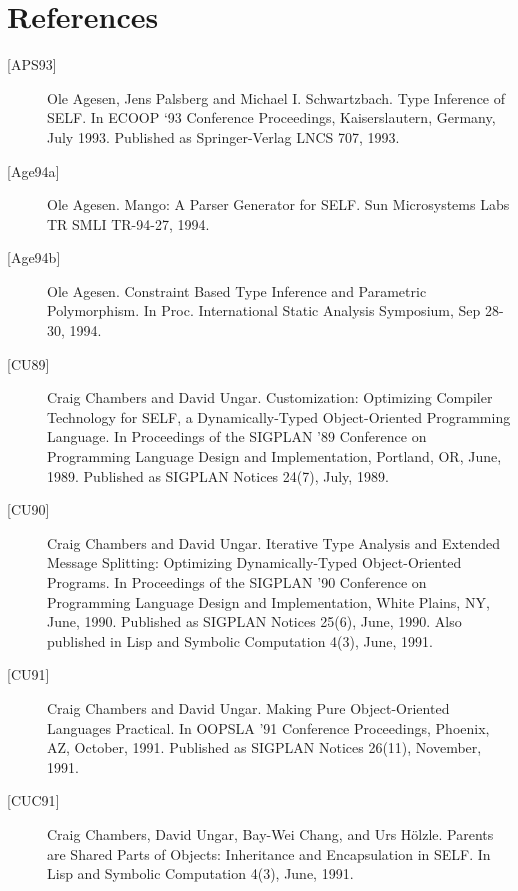 \documentclass[letterpaper,10pt,english]{sphinxmanual}
\begin{document}
\chapter{References}
\label{ref:references}\label{ref:citations}\label{ref::doc}\begin{description}
\item[{{[}APS93{]}}] \leavevmode
Ole Agesen, Jens Palsberg and Michael I. Schwartzbach. Type Inference of SELF. In ECOOP ‘93 Conference Proceedings, Kaiserslautern, Germany, July 1993. Published as Springer-Verlag LNCS 707, 1993.

\item[{{[}Age94a{]}}] \leavevmode
Ole Agesen. Mango: A Parser Generator for SELF. Sun Microsystems Labs TR SMLI TR-94-27, 1994.

\item[{{[}Age94b{]}}] \leavevmode
Ole Agesen. Constraint Based Type Inference and Parametric Polymorphism. In Proc. International Static Analysis Symposium, Sep 28-30, 1994.

\item[{{[}CU89{]}}] \leavevmode
Craig Chambers and David Ungar. Customization: Optimizing Compiler Technology for SELF, a Dynamically-Typed Object-Oriented Programming Language. In Proceedings of the SIGPLAN ’89 Conference on Programming Language Design and Implementation, Portland, OR, June, 1989. Published as SIGPLAN Notices 24(7), July, 1989.

\item[{{[}CU90{]}}] \leavevmode
Craig Chambers and David Ungar. Iterative Type Analysis and Extended Message Splitting: Optimizing Dynamically-Typed Object-Oriented Programs. In Proceedings of the SIGPLAN ’90 Conference on Programming Language Design and Implementation, White Plains, NY, June, 1990. Published as SIGPLAN Notices 25(6), June, 1990. Also published in Lisp and Symbolic Computation 4(3), June, 1991.

\item[{{[}CU91{]}}] \leavevmode
Craig Chambers and David Ungar. Making Pure Object-Oriented Languages Practical. In OOPSLA ’91 Conference Proceedings, Phoenix, AZ, October, 1991. Published as SIGPLAN Notices 26(11), November, 1991.

\item[{{[}CUC91{]}}] \leavevmode
Craig Chambers, David Ungar, Bay-Wei Chang, and Urs Hölzle. Parents are Shared Parts of Objects: Inheritance and Encapsulation in SELF. In Lisp and Symbolic Computation 4(3), June, 1991.


\end{description}
\end{document}
